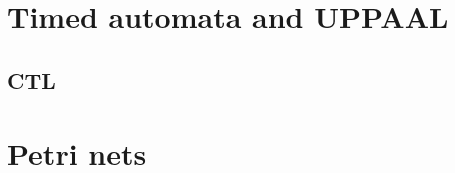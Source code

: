\documentclass[11pt]{article}
\begin{document}
\section{Timed automata and UPPAAL}

\subsection{CTL}

\section{Petri nets}
\end{document}
